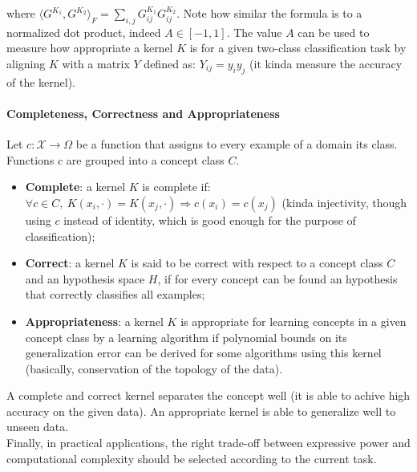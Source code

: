 where $\langle G^{K_1}, G^{K_2} \rangle_F = \sum\limits_{i,j} G^{K_1}_{ij}
G^{K_2}_{ij}$. Note how similar the formula is to a normalized dot product,
indeed $A \in [-1, 1]$. The value $A$ can be used to measure how appropriate a
kernel $K$ is for a given two-class classification task by aligning $K$ with a
matrix $Y$ defined as: $Y_{ij} = y_i y_j$ (it kinda measure the accuracy of the
kernel).

\paragraph{Completeness, Correctness and Appropriateness}
Let $c: \mathcal{X} \rightarrow \Omega$ be a function that assigns to every
example of a domain its class. Functions $c$ are grouped into a concept class
$C$.
\begin{itemize}
	\item \textbf{Complete}: a kernel $K$ is complete if: $\forall c \in C, \
		K(x_i, \cdot) = K(x_j, \cdot) \Rightarrow c(x_i) = c(x_j)$ 
		(kinda injectivity, though using $c$ instead of identity, which is good
		enough for the purpose of classification);

	\item \textbf{Correct}: a kernel $K$ is said to be correct with respect to a
		concept class $C$ and an hypothesis space $H$, if for every concept can
		be found an hypothesis that correctly classifies all examples;

	\item \textbf{Appropriateness}: a kernel $K$ is appropriate for learning
		concepts in a given concept class by a learning algorithm if polynomial
		bounds on its generalization error can be derived for some algorithms
		using this kernel (basically, conservation of the topology of the data).
\end{itemize}

A complete and correct kernel separates the concept well (it is able to achive
high accuracy on the given data). An appropriate kernel is able to generalize
well to unseen data.\\

Finally, in practical applications, the right trade-off between expressive power
and computational complexity should be selected according to the current task.
